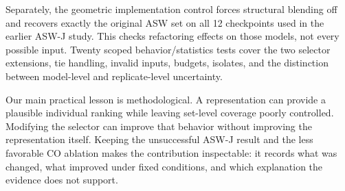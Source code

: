 Separately, the geometric implementation control forces structural blending off and recovers exactly the original ASW set on all 12 checkpoints used in the earlier ASW-J study. This checks refactoring effects on those models, not every possible input. Twenty scoped behavior/statistics tests cover the two selector extensions, tie handling, invalid inputs, budgets, isolates, and the distinction between model-level and replicate-level uncertainty.

Our main practical lesson is methodological. A representation can provide a plausible individual ranking while leaving set-level coverage poorly controlled. Modifying the selector can improve that behavior without improving the representation itself. Keeping the unsuccessful ASW-J result and the less favorable CO ablation makes the contribution inspectable: it records what was changed, what improved under fixed conditions, and which explanation the evidence does not support.
